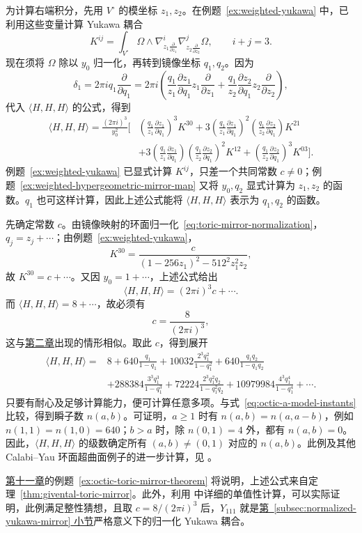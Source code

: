 \begin{example}
为计算右端积分，先用 $V^\circ$ 的模坐标 $z_1,z_2$。在例题~\ref{ex:weighted-yukawa} 中，已利用这些变量计算 Yukawa
耦合
\[
K^{ij}=\int_{V^\circ}\Omega\wedge\nabla_{z_1\frac{\partial}{\partial z_1}}^i\nabla_{z_2\frac{\partial}{\partial z_2}}^j\Omega,
\qquad i+j=3.
\]
现在须将 $\Omega$ 除以 $y_0$ 归一化，再转到镜像坐标 $q_1,q_2$。因为
\[
\delta_1=2\pi iq_1\frac{\partial}{\partial q_1}
=2\pi i\left(\frac{q_1}{z_1}\frac{\partial z_1}{\partial q_1}z_1\frac{\partial}{\partial z_1}
+\frac{q_1}{z_2}\frac{\partial z_2}{\partial q_1}z_2\frac{\partial}{\partial z_2}\right),
\]
代入 $\langle H,H,H\rangle$ 的公式，得到
\[
\begin{aligned}
\langle H,H,H\rangle=\frac{(2\pi i)^3}{y_0^2}\Biggl[&
\left(\frac{q_1}{z_1}\frac{\partial z_1}{\partial q_1}\right)^3K^{30}
+3\left(\frac{q_1}{z_1}\frac{\partial z_1}{\partial q_1}\right)^2
\left(\frac{q_1}{z_2}\frac{\partial z_2}{\partial q_1}\right)K^{21}\\
&+3\left(\frac{q_1}{z_1}\frac{\partial z_1}{\partial q_1}\right)
\left(\frac{q_1}{z_2}\frac{\partial z_2}{\partial q_1}\right)^2K^{12}
+\left(\frac{q_1}{z_2}\frac{\partial z_2}{\partial q_1}\right)^3K^{03}\Biggr].
\end{aligned}
\]
例题~\ref{ex:weighted-yukawa} 已显式计算 $K^{ij}$，只差一个共同常数 $c\ne0$；例题~\ref{ex:weighted-hypergeometric-mirror-map} 又将 $y_0,q_2$ 显式计算为 $z_1,z_2$ 的函数。$q_1$ 也可这样计算，因此上述公式能将 $\langle H,H,H\rangle$ 表示为 $q_1,q_2$ 的函数。

先确定常数 $c$。由镜像映射的环面归一化~\eqref{eq:toric-mirror-normalization}，$q_j=z_j+\cdots$；由例题~\ref{ex:weighted-yukawa}，
\[
K^{30}=\frac c{(1-256z_1)^2-512^2z_1^2z_2},
\]
故 $K^{30}=c+\cdots$。又因 $y_0=1+\cdots$，上述公式给出
\[
\langle H,H,H\rangle=(2\pi i)^3c+\cdots.
\]
而 $\langle H,H,H\rangle=8+\cdots$，故必须有
\[
c=\frac8{(2\pi i)^3},
\]
这与\hyperref[chap:quintic]{第二章}出现的情形相似。取此 $c$，得到展开
\[
\begin{aligned}
\langle H,H,H\rangle={}&8+640\frac{q_1}{1-q_1}
+10032\frac{2^3q_1^2}{1-q_1^2}+640\frac{q_1q_2}{1-q_1q_2}\\
&+288384\frac{3^3q_1^3}{1-q_1^3}
+72224\frac{2^3q_1^2q_2}{1-q_1^2q_2}
+10979984\frac{4^3q_1^4}{1-q_1^4}+\cdots.
\end{aligned}
\]
只要有耐心及足够计算能力，便可计算任意多项。与式~\eqref{eq:octic-a-model-instants} 比较，得到瞬子数 $n(a,b)$。可证明，$a\ge1$ 时有 $n(a,b)=n(a,a-b)$，例如 $n(1,1)=n(1,0)=640$；$b>a$ 时，除 $n(0,1)=4$ 外，都有 $n(a,b)=0$。因此，$\langle H,H,H\rangle$ 的级数确定所有 $(a,b)\ne(0,1)$ 对应的 $n(a,b)$。此例及其他 Calabi--Yau 环面超曲面例子的进一步计算，见 。

\hyperref[chap:mirror-theorem]{第十一章}的例题~\ref{ex:octic-toric-mirror-theorem} 将说明，上述公式来自定理~\ref{thm:givental-toric-mirror}。此外，利用  中详细的单值性计算，可以实际证明，此例满足整性猜想，且取 $c=8/(2\pi i)^3$ 后，$Y_{111}$ 就是\hyperref[subsec:normalized-yukawa-mirror]{第~\ref*{subsec:normalized-yukawa-mirror} 小节}严格意义下的归一化 Yukawa 耦合。
\end{example}
